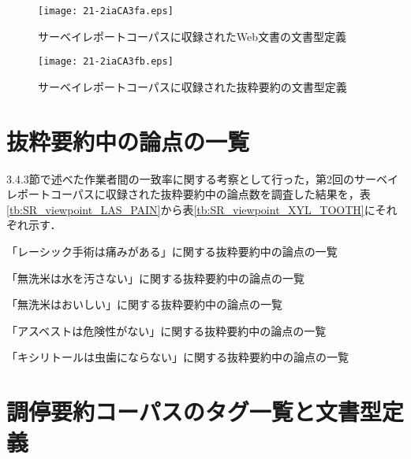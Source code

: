 \documentclass[japanese]{jnlp_1.4}
\begin{document}
\clearpage
\begin{figure}[p]
\begin{center}
\texttt{[image: 21-2iaCA3fa.eps]}
\end{center}
 \caption{サーベイレポートコーパスに収録されたWeb文書の文書型定義}
 \label{fg:survey_report_web_dtd}
\end{figure}
\begin{figure}[p]
\begin{center}
\texttt{[image: 21-2iaCA3fb.eps]}
\end{center}
 \caption{サーベイレポートコーパスに収録された抜粋要約の文書型定義}
 \label{fg:survey_report_sum_dtd}
\end{figure}

\clearpage
\section{抜粋要約中の論点の一覧}


3.4.3節で述べた作業者間の一致率に関する考察として行った，第2回のサーベイレポートコーパスに収録された抜粋要約中の論点数を調査した結果を，表\ref{tb:SR_viewpoint_LAS_PAIN}から表\ref{tb:SR_viewpoint_XYL_TOOTH}にそれぞれ示す．

\begin{table}[h]
 \caption{「レーシック手術は痛みがある」に関する抜粋要約中の論点の一覧}
 \label{tb:SR_viewpoint_LAS_PAIN}

\end{table}
\begin{table}[h]
 \caption{「無洗米は水を汚さない」に関する抜粋要約中の論点の一覧}
 \label{tb:SR_viewpoint_RIC_CLEAN}

\end{table}

\clearpage
\begin{table}[p]
 \caption{「無洗米はおいしい」に関する抜粋要約中の論点の一覧}
 \label{tb:SR_viewpoint_RIC_TASTE}

\end{table}
\begin{table}[p]
 \caption{「アスベストは危険性がない」に関する抜粋要約中の論点の一覧}
 \label{tb:SR_viewpoint_ASB_RISK}

\end{table}
\begin{table}[p]
 \caption{「キシリトールは虫歯にならない」に関する抜粋要約中の論点の一覧}
 \label{tb:SR_viewpoint_XYL_TOOTH}

\end{table}

\clearpage
\section{調停要約コーパスのタグ一覧と文書型定義}
\end{document}

